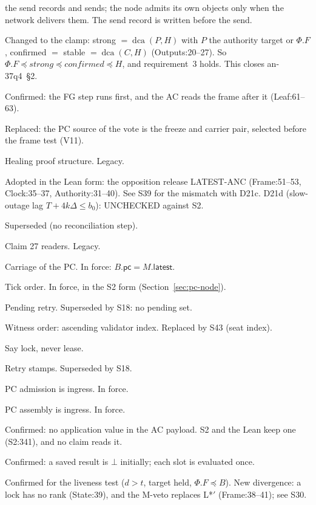 \documentclass{article}
\newcommand{\Fr}{\Phi}
\newcommand{\pc}{\mathsf{pc}}
\begin{document}
\begin{description}
  the send records and sends; the node admits its own objects only when
  the network delivers them.  The send record is written before the
  send.
\item[D17] Changed to the clamp: strong $=\operatorname{dca}(P,H)$ with
  $P$ the authority target or $\Fr.F$, confirmed $=$ stable
  $=\operatorname{dca}(C,H)$ (Outputs:20--27).  So
  $\Fr.F\preceq\mathit{strong}\preceq\mathit{confirmed}\preceq H$, and
  requirement~3 holds.  This closes an-37q4~\S2.
\item[D18] Confirmed: the FG step runs first, and the AC reads the frame
  after it (Leaf:61--63).
\item[D19] Replaced: the PC source of the vote is the freeze and carrier
  pair, selected before the frame test (V11).
\item[D20] Healing proof structure.  Legacy.
\item[D21] Adopted in the Lean form: the opposition release LATEST-ANC
  (Frame:51--53, Clock:35--37, Authority:31--40).  See S39 for the
  mismatch with D21c.  D21d (slow-outage lag $T+4k\Delta\leq b_0$):
  UNCHECKED against S2.
\item[S1] Superseded (no reconciliation step).
\item[S2] Claim 27 readers.  Legacy.
\item[S3] Carriage of the PC.  In force: $B.\pc=M.\mathsf{latest}$.
\item[S4] Tick order.  In force, in the S2 form (Section~\ref{sec:pc-node}).
\item[S5] Pending retry.  Superseded by S18: no pending set.
\item[S6] Witness order: ascending validator index.  Replaced by S43
  (seat index).
\item[S7] Say lock, never lease.
\item[S8] Retry stamps.  Superseded by S18.
\item[S9] PC admission is ingress.  In force.
\item[S10] PC assembly is ingress.  In force.
\item[S11] Confirmed: no application value in the AC payload.  S2 and the
  Lean keep one (S2:341), and no claim reads it.
\item[S12] Confirmed: a saved result is $\bot$ initially; each slot is
  evaluated once.
\item[S13] Confirmed for the liveness test ($d>t$, target held,
  $\Fr.F\preceq B$).  New divergence: a lock has no rank (State:39), and
  the M-veto replaces L*$'$ (Frame:38--41); see S30.

\end{description}
\end{document}
